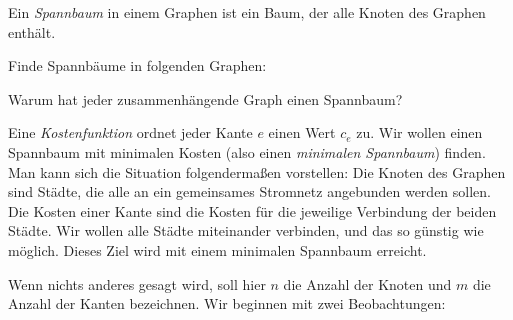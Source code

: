 \documentclass{zusammenfassung}
\begin{document}
\pagebreak

Ein \emph{Spannbaum} in einem Graphen ist ein Baum, der alle Knoten des Graphen enthält.

\begin{aufgabe}
	Finde Spannbäume in folgenden Graphen:
	\begin{center}
	\end{center}
\end{aufgabe}

\begin{aufgabe}
	Warum hat jeder zusammenhängende Graph einen Spannbaum?
\end{aufgabe}

Eine \emph{Kostenfunktion} ordnet jeder Kante $e$ einen Wert $c_e$ zu. Wir wollen einen Spannbaum mit minimalen Kosten (also einen
\emph{minimalen Spannbaum}) finden. Man kann sich die Situation folgendermaßen vorstellen: Die Knoten des Graphen sind Städte, die
alle an ein gemeinsames Stromnetz angebunden werden sollen. Die Kosten einer Kante sind die Kosten für die jeweilige Verbindung
der beiden Städte. Wir wollen alle Städte miteinander verbinden, und das so günstig wie möglich. Dieses Ziel wird mit einem
minimalen Spannbaum erreicht.

Wenn nichts anderes gesagt wird, soll hier $n$ die Anzahl der Knoten und $m$ die Anzahl der Kanten bezeichnen. Wir beginnen mit
zwei Beobachtungen:
\end{document}
